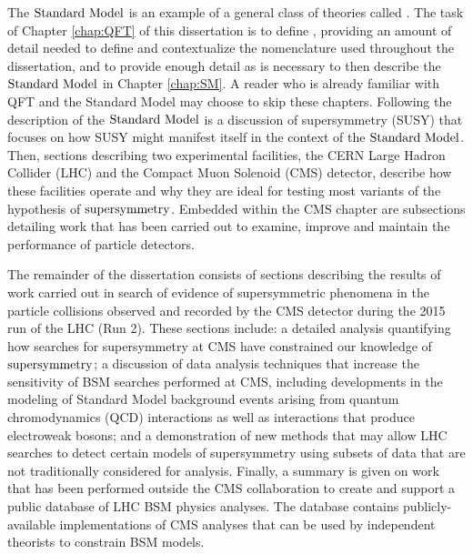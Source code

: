 The $\text{Standard\ Model}$ is an example of a general class of theories called \qfts. The task of Chapter \ref{chap:QFT} of this dissertation is to define \qft, providing an amount of detail needed to define and contextualize the nomenclature used throughout the dissertation, and to provide enough detail as is necessary to then describe the $\text{Standard\ Model}$ in Chapter \ref{chap:SM}. A reader who is already familiar with QFT and the Standard Model may choose to skip these chapters. Following the description of the $\text{Standard\ Model}$ is a discussion of supersymmetry (SUSY) that focuses on how SUSY might manifest itself in the context of the $\text{Standard\ Model}$. Then, sections describing two experimental facilities, the CERN Large Hadron Collider (LHC) and the Compact Muon Solenoid (CMS) detector, describe how these facilities operate and why they are ideal for testing most variants of the hypothesis of $\text{supersymmetry}$. Embedded within the CMS chapter are subsections detailing work that has been carried out to examine, improve and maintain the performance of particle detectors. 

The remainder of the dissertation consists of sections describing the results of work carried out in search of evidence of supersymmetric phenomena in the particle collisions observed and recorded by the CMS detector during the 2015 run of the LHC (Run 2). These sections include: a detailed analysis quantifying how searches for supersymmetry at CMS have constrained our knowledge of $\text{supersymmetry}$; a discussion of data analysis techniques that increase the sensitivity of BSM searches performed at CMS, including developments in the modeling of Standard Model background events arising from quantum chromodynamics (QCD) interactions as well as interactions that produce electroweak bosons; and a demonstration of new methods that may allow LHC searches to detect certain models of supersymmetry using subsets of data that are not traditionally considered for analysis. Finally, a summary is given on work that has been performed outside the CMS collaboration to create and support a public database of LHC BSM physics analyses. The database contains publicly-available implementations of CMS analyses that can be used by independent theorists to constrain BSM models.
